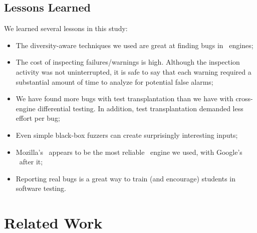 \documentclass[sigconf,review, anonymous]{acmart}
\begin{document}

\subsection{Lessons Learned}
\label{sec:lessons}

We learned several lessons in this study:

\begin{itemize}
  \item The diversity-aware techniques we used are great
    at finding bugs in \js\ engines;
  \item The cost of inspecting failures/warnings is high. Although the
    inspection activity was not uninterrupted, it is safe to say that
    each warning required a substantial amount of time to analyze for
    potential false alarms;
  \item We have found more bugs with test transplantation than we have
    with cross-engine differential testing. In addition, test
    transplantation demanded less effort per bug;
  \item Even simple black-box fuzzers can create surprisingly
    interesting inputs;
  \item Mozilla's \smonkey\ appears to be the most reliable
    \js\ engine we used, with Google's \veight\ after it;
  \item Reporting real bugs is a great way to train (and encourage)
    students in software testing.
\end{itemize}




\section{Related Work}
\label{sec:related-work}
\end{document}
